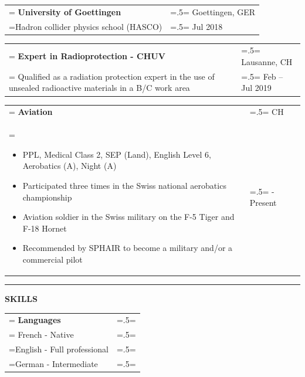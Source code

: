 \documentclass[letterpaper, 11pt]{article}
\begin{document}
\begin{tabularx}{1.0\textwidth} { 
   >{\raggedright\arraybackslash\hsize=1.5\hsize\linewidth=\hsize}X 
   >{\raggedleft\arraybackslash\hsize=.5\hsize\linewidth=\hsize}X }
\normalsize
\bf{University of Goettingen} & Goettingen, GER \\
\normalfont Hadron collider physics school (HASCO) & Jul 2018 \\
\end{tabularx}
\vspace{0.25cm}

\begin{tabularx}{1.0\textwidth} { 
   >{\raggedright\arraybackslash\hsize=1.5\hsize\linewidth=\hsize}X 
   >{\raggedleft\arraybackslash\hsize=.5\hsize\linewidth=\hsize}X }
\normalsize
\bf{Expert in Radioprotection - CHUV} & Lausanne, CH\\
\normalfont 
Qualified as a radiation protection expert in the use of unsealed radioactive materials in a B/C work area & Feb -- Jul 2019
\end{tabularx}
\vspace{0.25cm}

\begin{tabularx}{1.0\textwidth} { 
   >{\raggedright\arraybackslash\hsize=1.5\hsize\linewidth=\hsize}X 
   >{\raggedleft\arraybackslash\hsize=.5\hsize\linewidth=\hsize}X }
\normalsize
\bf{Aviation} & CH\\
\normalfont \begin{itemize}[leftmargin=*,noitemsep,topsep=0pt]
\item PPL, Medical Class 2, SEP (Land), English Level 6, Aerobatics (A), Night (A)
\item Participated three times in the Swiss national aerobatics championship
\item Aviation soldier in the Swiss military on the F-5 Tiger and F-18 Hornet
\item Recommended by SPHAIR to become a military and/or a commercial pilot
\end{itemize} & 2014 - Present
\end{tabularx}


\begin{center}
\noindent\rule{0.75\textwidth}{1pt}
\end{center}

\begin{center}
\large\bf{SKILLS}
\end{center}

\begin{tabularx}{1.0\textwidth} { 
   >{\raggedright\arraybackslash\hsize=1.5\hsize\linewidth=\hsize}X 
   >{\raggedleft\arraybackslash\hsize=.5\hsize\linewidth=\hsize}X }
\normalsize
\bf{Languages} & \\
\normalfont
French - Native & \\
English - Full professional & \\
German - Intermediate 
\end{tabularx}
\vspace{0.25cm}
\end{document}
